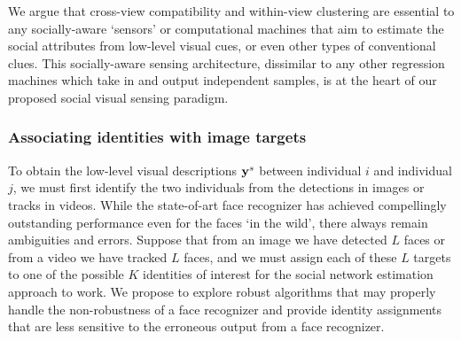 

We argue that cross-view compatibility and within-view clustering are essential to any socially-aware `sensors' or computational machines that aim to estimate the social attributes from low-level visual cues, or even other types of conventional clues. This socially-aware sensing architecture, dissimilar to any other regression machines which take in and output independent samples, is at the heart of our proposed social visual sensing paradigm.




\subsubsection{Associating identities with image targets}
\label{sec:assoc}

To obtain the low-level visual descriptions ${\bf y}^s$ between individual $i$ and individual $j$, we must first identify the two individuals from the detections in images or tracks in videos. While the state-of-art face recognizer has achieved compellingly outstanding performance even for the faces `in the wild', there always remain ambiguities and errors. Suppose that from an image we have detected $L$ faces or from a video we have tracked $L$ faces, and we must assign each of these $L$ targets to one of the possible $K$ identities of interest for the social network estimation approach to work. We propose to explore robust algorithms that may properly handle the non-robustness of a face recognizer and provide identity assignments that are less sensitive to the erroneous output from a face recognizer.

